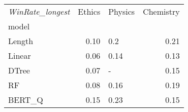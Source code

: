 \begin{tabular}{lrlr}
\toprule
\textit{WinRate\_longest} &  Ethics & Physics &  Chemistry \\
model  &         &         &            \\
\midrule
Length &    0.10 &     0.2 &       0.21 \\
Linear &    0.06 &    0.14 &       0.13 \\
DTree  &    0.07 &       - &       0.15 \\
RF     &    0.08 &    0.16 &       0.19 \\
BERT\_Q &    0.15 &    0.23 &       0.15 \\
\bottomrule
\end{tabular}

